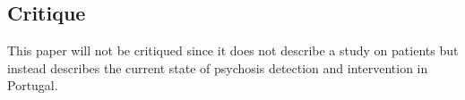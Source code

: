 \documentclass{Paper_Summary}
\begin{document}
\makepapertitle

\breakline

\begin{center}
    \section*{Critique}
\end{center}

    This paper will not be critiqued since it does not describe a study on patients but instead describes the current state of psychosis detection and intervention in Portugal.

\breakline
\end{document}
